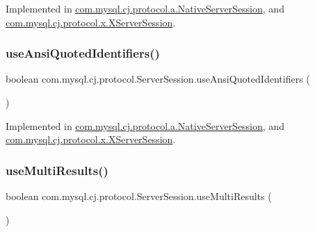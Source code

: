 Implemented in \mbox{\hyperlink{classcom_1_1mysql_1_1cj_1_1protocol_1_1a_1_1_native_server_session_ab4ff668a507b74d55b1a67a47e983660}{com.\+mysql.\+cj.\+protocol.\+a.\+Native\+Server\+Session}}, and \mbox{\hyperlink{classcom_1_1mysql_1_1cj_1_1protocol_1_1x_1_1_x_server_session_a7b76659fa43ab520da92bdfdfcb4d67a}{com.\+mysql.\+cj.\+protocol.\+x.\+X\+Server\+Session}}.

\mbox{\label{interfacecom_1_1mysql_1_1cj_1_1protocol_1_1_server_session_a55ca4e6fce372e587c0bbc46089fa262}} 
\subsubsection{\texorpdfstring{use\+Ansi\+Quoted\+Identifiers()}{useAnsiQuotedIdentifiers()}}
{\footnotesize\ttfamily boolean com.\+mysql.\+cj.\+protocol.\+Server\+Session.\+use\+Ansi\+Quoted\+Identifiers (\begin{DoxyParamCaption}{ }\end{DoxyParamCaption})}



Implemented in \mbox{\hyperlink{classcom_1_1mysql_1_1cj_1_1protocol_1_1a_1_1_native_server_session_a46c8526aa6827ff0fd5a934cf40aab00}{com.\+mysql.\+cj.\+protocol.\+a.\+Native\+Server\+Session}}, and \mbox{\hyperlink{classcom_1_1mysql_1_1cj_1_1protocol_1_1x_1_1_x_server_session_aba6be8a1d25c4651ab8098caf4884041}{com.\+mysql.\+cj.\+protocol.\+x.\+X\+Server\+Session}}.

\mbox{\label{interfacecom_1_1mysql_1_1cj_1_1protocol_1_1_server_session_a7d92f74e5fe2cd93115d904f136b090b}} 
\subsubsection{\texorpdfstring{use\+Multi\+Results()}{useMultiResults()}}
{\footnotesize\ttfamily boolean com.\+mysql.\+cj.\+protocol.\+Server\+Session.\+use\+Multi\+Results (\begin{DoxyParamCaption}{ }\end{DoxyParamCaption})}



